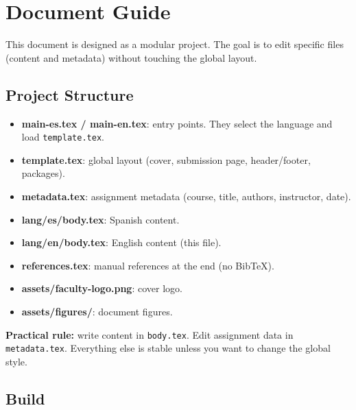 
\section{Document Guide}
\vspace{2mm}

This document is designed as a modular project. The goal is to edit specific files (content and metadata) without touching the global layout.


\subsection{Project Structure}
\vspace{2mm}

\begin{itemize}
  \item \textbf{main-es.tex / main-en.tex}: entry points. They select the language and load \texttt{template.tex}.
  \item \textbf{template.tex}: global layout (cover, submission page, header/footer, packages).
  \item \textbf{metadata.tex}: assignment metadata (course, title, authors, instructor, date).
  \item \textbf{lang/es/body.tex}: Spanish content.
  \item \textbf{lang/en/body.tex}: English content (this file).
  \item \textbf{references.tex}: manual references at the end (no BibTeX).
  \item \textbf{assets/faculty-logo.png}: cover logo.
  \item \textbf{assets/figures/}: document figures.
\end{itemize}

\vspace{2mm}

\noindent
\textbf{Practical rule:} write content in \texttt{body.tex}. Edit assignment data in \texttt{metadata.tex}. Everything else is stable unless you want to change the global style.


\subsection{Build}
\vspace{2mm}

